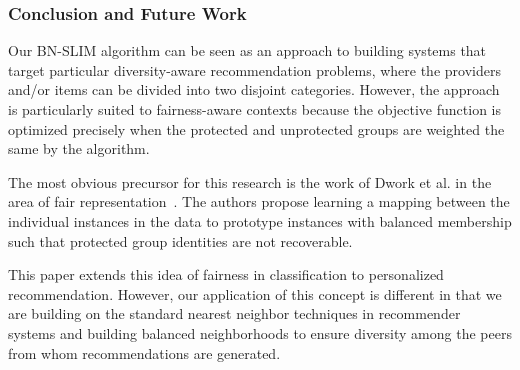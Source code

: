

\subsubsection{\textbf{Conclusion and Future Work}}

Our BN-SLIM algorithm can be seen as an approach to building systems that target particular diversity-aware recommendation problems, where the providers and/or items can be divided into two disjoint categories. However, the approach is particularly suited to fairness-aware contexts because the objective function is optimized precisely when the protected and unprotected groups are weighted the same by the algorithm. 

The most obvious precursor for this research is the work of Dwork et al. in the area of fair representation~\cite{zemel2013learning,fairness}. The authors propose learning a mapping between the individual instances in the data to prototype instances with balanced membership such that protected group identities are not recoverable. 

This paper extends this idea of fairness in classification to personalized recommendation. However, our application of this concept is different in that we are building on the standard nearest neighbor techniques in recommender systems and building balanced neighborhoods to ensure diversity among the peers from whom recommendations are generated. 

